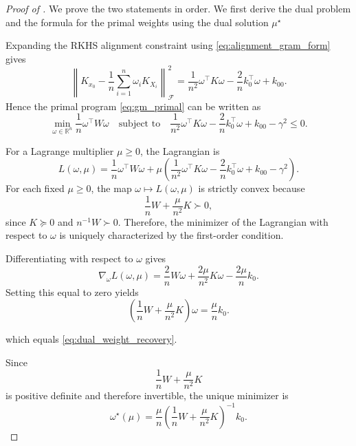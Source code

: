 \documentclass[11pt]{article}
\newcommand{\R}{\mathbb{R}}
\newcommand{\F}{\mathcal{F}}
\begin{document}
\label{proof:gm_dual}
\begin{proof}[Proof of ]
We prove the two statements in order. We first derive the dual problem and the formula for the primal weights using the dual solution $\mu^\star$

\medskip


Expanding the RKHS alignment constraint using
\eqref{eq:alignment_gram_form} gives
\[
  \left\|
  K_{x_0}
  -\frac1n\sum_{i=1}^n\omega_iK_{X_i}
  \right\|_{\F}^2
  =
  \frac1{n^2}\omega^\top K\omega
  -\frac2n k_0^\top\omega
  +k_{00}.
\]
Hence the primal program \eqref{eq:gm_primal} can be written as
\[
  \min_{\omega\in\R^n}\frac1n\omega^\top W\omega
  \quad\text{subject to}\quad
  \frac1{n^2}\omega^\top K\omega
  -\frac2n k_0^\top\omega
  +k_{00}-\gamma^2
  \leq 0.
\]

\noindent
For a Lagrange multiplier $\mu\geq0$, the Lagrangian is
\[
  L(\omega,\mu)
  =
  \frac1n\omega^\top W\omega
  +
  \mu\left(
  \frac1{n^2}\omega^\top K\omega
  -\frac2n k_0^\top\omega
  +k_{00}-\gamma^2
  \right).
\]
For each fixed $\mu\geq0$, the map
$\omega\mapsto L(\omega,\mu)$ is strictly convex because
\[
  \frac1n W+\frac{\mu}{n^2}K
  \succ 0,
\]
since $K\succeq0$ and $n^{-1}W\succ0$. Therefore, the minimizer of
the Lagrangian with respect to $\omega$ is uniquely characterized by
the first-order condition.

\noindent Differentiating with respect to $\omega$ gives
\[
  \nabla_\omega L(\omega,\mu)
  =
  \frac2nW\omega
  +
  \frac{2\mu}{n^2}K\omega
  -
  \frac{2\mu}{n}k_0.
\]
Setting this equal to zero yields
\[
  \left(
  \frac1nW+\frac\mu{n^2}K
  \right)\omega
  =
  \frac\mu n k_0.
\]

\noindent which equals \eqref{eq:dual_weight_recovery}.

\noindent Since
\[
  \frac1nW+\frac\mu{n^2}K
\]
is positive definite and therefore invertible, the unique minimizer is
\begin{equation}
\label{eq:weight_formula}
  \omega^\star(\mu)
  =
  \frac\mu n
  \left(
  \frac1nW+\frac\mu{n^2}K
  \right)^{-1}
  k_0.
\end{equation}


\end{proof}
\end{document}
